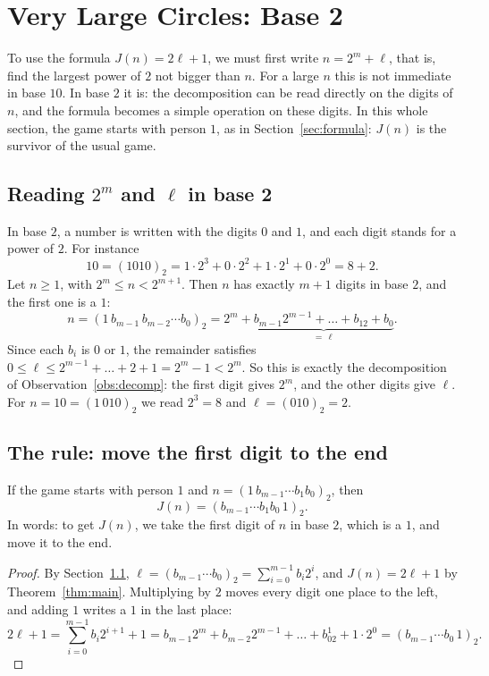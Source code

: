\section{Very Large Circles: Base 2}

To use the formula $J(n)=2\ell+1$, we must first write $n=2^m+\ell$, that is,
find the largest power of $2$ not bigger than $n$. For a large $n$ this is not
immediate in base $10$. In base $2$ it is: the decomposition can be read
directly on the digits of $n$, and the formula becomes a simple operation on
these digits. In this whole section, the game starts with person $1$, as in
Section~\ref{sec:formula}: $J(n)$ is the survivor of the usual game.

\subsection{Reading \texorpdfstring{$2^m$}{2\^{}m} and \texorpdfstring{$\ell$}{l} in base 2}\label{sec:bindecomp}

In base $2$, a number is written with the digits $0$ and $1$, and each digit
stands for a power of $2$. For instance
\[
10=(1010)_2=1\cdot2^3+0\cdot2^2+1\cdot2^1+0\cdot2^0=8+2 .
\]
Let $n\geq1$, with $2^m\leq n<2^{m+1}$. Then $n$ has exactly $m+1$ digits in
base $2$, and the first one is a $1$:
\[
n=(1\,b_{m-1}\,b_{m-2}\cdots b_0)_2
 =2^m+\underbrace{b_{m-1}2^{m-1}+\dots+b_12+b_0}_{=\,\ell}.
\]
Since each $b_i$ is $0$ or $1$, the remainder satisfies
$0\leq\ell\leq2^{m-1}+\dots+2+1=2^m-1<2^m$. So this is exactly the
decomposition of Observation~\ref{obs:decomp}: the first digit gives $2^m$,
and the other digits give $\ell$. For $n=10=(1\,010)_2$ we read $2^3=8$ and
$\ell=(010)_2=2$.

\subsection{The rule: move the first digit to the end}

\begin{theo}\label{thm:binary}
If the game starts with person $1$ and $n=(1\,b_{m-1}\cdots b_1b_0)_2$, then
\[
J(n)=(b_{m-1}\cdots b_1b_0\,1)_2 .
\]
In words: to get $J(n)$, we take the first digit of $n$ in base $2$, which is
a $1$, and move it to the end.
\end{theo}

\begin{proof}
By Section~\ref{sec:bindecomp}, $\ell=(b_{m-1}\cdots b_0)_2=\sum_{i=0}^{m-1}b_i2^i$, and
$J(n)=2\ell+1$ by Theorem~\ref{thm:main}. Multiplying by $2$ moves every digit
one place to the left, and adding $1$ writes a $1$ in the last place:
\[
2\ell+1=\sum_{i=0}^{m-1}b_i2^{i+1}+1
=b_{m-1}2^m+b_{m-2}2^{m-1}+\dots+b_02^1+1\cdot2^0
=(b_{m-1}\cdots b_0\,1)_2 .
\]
\end{proof}

